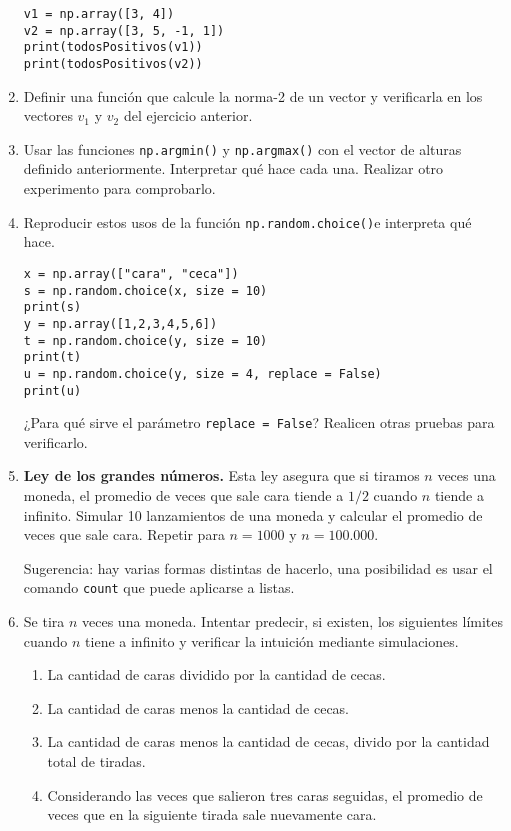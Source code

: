\documentclass[a4paper,11pt]{article}
\theoremstyle{definition}
\begin{document}
\begin{enumerate}[resume]
\begin{lstlisting}
v1 = np.array([3, 4])
v2 = np.array([3, 5, -1, 1])
print(todosPositivos(v1))
print(todosPositivos(v2))
\end{lstlisting}

\item Definir una función que calcule la norma-2 de un vector y verificarla en los vectores $v_1$ y $v_2$ del ejercicio anterior.

\item Usar las funciones \lstinline{np.argmin()} y \lstinline{np.argmax()} con el vector de alturas definido anteriormente. Interpretar qué hace cada una. Realizar otro experimento para comprobarlo.

\item Reproducir estos usos de la función \lstinline{np.random.choice()}e interpreta qué hace.
\begin{lstlisting}
x = np.array(["cara", "ceca"])
s = np.random.choice(x, size = 10)
print(s)
y = np.array([1,2,3,4,5,6])
t = np.random.choice(y, size = 10)
print(t)
u = np.random.choice(y, size = 4, replace = False)
print(u)
\end{lstlisting}

¿Para qué sirve el parámetro \lstinline{replace = False}? Realicen otras pruebas para verificarlo.

\item {\textbf{Ley de los grandes números.}} Esta ley asegura que si tiramos $n$ veces una moneda, el promedio de veces que sale cara tiende a $1/2$ cuando $n$ tiende a infinito.
Simular 10 lanzamientos de una moneda y calcular el promedio de veces que sale cara. Repetir para $n = 1000$ y $n = 100.000$.

Sugerencia: hay varias formas distintas de hacerlo, una posibilidad es usar el comando \lstinline{count} que puede aplicarse a listas.

\item Se tira $n$ veces una moneda. Intentar predecir, si existen, los siguientes límites cuando $n$ tiene a infinito y verificar la intuición mediante simulaciones.

\begin{enumerate}
\item La cantidad de caras dividido por la cantidad de cecas.
\item La cantidad de caras menos la cantidad de cecas.
\item La cantidad de caras menos la cantidad de cecas, divido por la cantidad total de tiradas.
\item Considerando las veces que salieron tres caras seguidas, el promedio de veces que en la siguiente tirada sale nuevamente cara.
\end{enumerate}



\end{enumerate}
\end{document}
